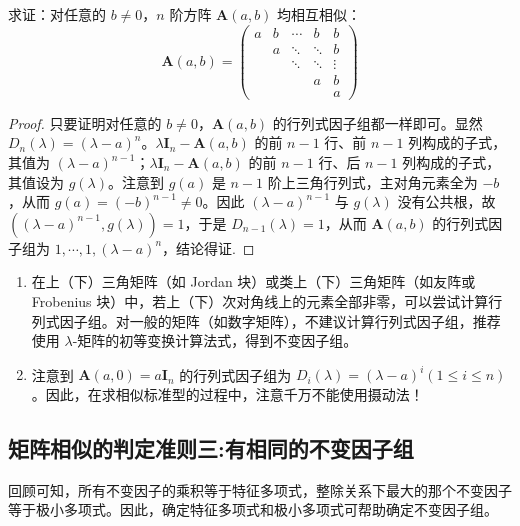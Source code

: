 \documentclass[../../main.tex]{subfiles}
\begin{document}
\begin{proposition}\label{proposition:A(a,b)矩阵均相似}
求证：对任意的 $b \neq 0$，$n$ 阶方阵 $\boldsymbol{A}(a,b)$ 均相互相似：
\[
\boldsymbol{A}(a,b) = 
\begin{pmatrix}
a & b & \cdots & b & b \\
 & a & \ddots & \ddots & b \\
 & & \ddots & \ddots & \vdots \\
 & & & a & b \\
 & & & & a
\end{pmatrix}
\]
\end{proposition}
\begin{proof}
只要证明对任意的 $b \neq 0$，$\boldsymbol{A}(a,b)$ 的行列式因子组都一样即可。显然 $D_n(\lambda) = (\lambda - a)^n$。$\lambda \boldsymbol{I}_n - \boldsymbol{A}(a,b)$ 的前 $n - 1$ 行、前 $n - 1$ 列构成的子式，其值为 $(\lambda - a)^{n - 1}$；$\lambda \boldsymbol{I}_n - \boldsymbol{A}(a,b)$ 的前 $n - 1$ 行、后 $n - 1$ 列构成的子式，其值设为 $g(\lambda)$。注意到 $g(a)$ 是 $n - 1$ 阶上三角行列式，主对角元素全为 $-b$，从而 $g(a) = (-b)^{n - 1} \neq 0$。因此 $(\lambda - a)^{n - 1}$ 与 $g(\lambda)$ 没有公共根，故 $((\lambda - a)^{n - 1}, g(\lambda)) = 1$，于是 $D_{n - 1}(\lambda) = 1$，从而 $\boldsymbol{A}(a,b)$ 的行列式因子组为 $1, \cdots, 1, (\lambda - a)^n$，结论得证.
\end{proof}
\begin{remark}
\begin{enumerate}[(1)]
\item 在上（下）三角矩阵（如 Jordan 块）或类上（下）三角矩阵（如友阵或 Frobenius 块）中，若上（下）次对角线上的元素全部非零，可以尝试计算行列式因子组。对一般的矩阵（如数字矩阵），不建议计算行列式因子组，推荐使用 $\lambda$-矩阵的初等变换计算法式，得到不变因子组。


\item 注意到 $\boldsymbol{A}(a,0) = a\boldsymbol{I}_n$ 的行列式因子组为 $D_i(\lambda) = (\lambda - a)^i (1 \leqslant  i \leqslant  n)$。因此，在求相似标准型的过程中，注意千万不能使用摄动法！ 
\end{enumerate}
\end{remark}



\subsection{矩阵相似的判定准则三:有相同的不变因子组}

回顾可知，所有不变因子的乘积等于特征多项式，整除关系下最大的那个不变因子等于极小多项式。因此，确定特征多项式和极小多项式可帮助确定不变因子组。
\end{document}
